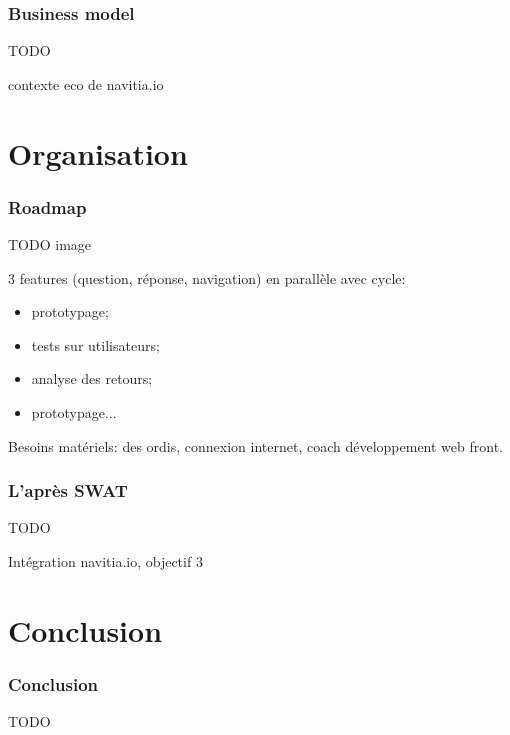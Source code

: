 \documentclass[table]{beamer}
\begin{document}
\begin{frame}
  \frametitle{Business model}

  TODO

  contexte eco de navitia.io
\end{frame}

\section{Organisation}

\begin{frame}
  \frametitle{Roadmap}

  TODO image

  3 features (question, réponse, navigation) en parallèle avec cycle:
  \begin{itemize}
  \item prototypage;
  \item tests sur utilisateurs;
  \item analyse des retours;
  \item prototypage...
  \end{itemize}

  Besoins matériels: des ordis, connexion internet, coach
  développement web front.
\end{frame}

\begin{frame}
  \frametitle{L'après SWAT}

  TODO

  Intégration navitia.io, objectif 3
\end{frame}

\section{Conclusion}

\begin{frame}
  \frametitle{Conclusion}

  TODO
\end{frame}

\begin{frame}
  \titlepage
\end{frame}
\end{document}
